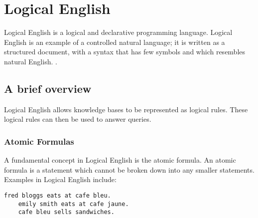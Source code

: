 \documentclass[../main.tex]{subfiles}
\begin{document}
\chapter{Logical English}
\label{chapter:le}
Logical English is a logical and declarative programming language. Logical English is an example of a controlled natural language; it is written as a structured document, with a syntax that has few symbols and which resembles natural English. \cite{logical_english}.

\section{A brief overview}
Logical English allows knowledge bases to be represented as logical rules. These logical rules can then be used to answer queries. 

\subsection{Atomic Formulas}
A fundamental concept in Logical English is the atomic formula. An atomic formula is a statement which cannot be broken down into any smaller statements. Examples in Logical English include:
\begin{lstlisting}[language={LE},caption={An example of three atomic formulas in Logical English.},label={le:atomic formulas}]
    fred bloggs eats at cafe bleu.
    emily smith eats at cafe jaune.
    cafe bleu sells sandwiches.
\end{lstlisting}
\end{document}
